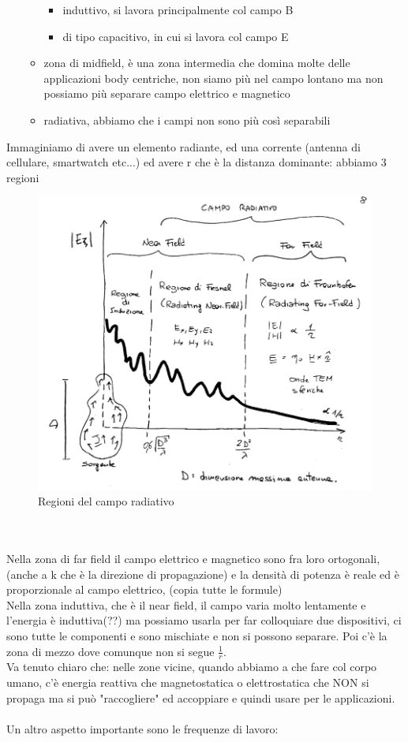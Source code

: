 \documentclass[oneside, 12pt]{extbook}
\begin{document}
\begin{itemize}
\begin{itemize}
		\begin{itemize}
			\item induttivo, si lavora principalmente col campo B
			\item di tipo capacitivo, in cui si lavora col campo E 
		\end{itemize}
		\item zona di midfield, è una zona intermedia che domina molte delle applicazioni body centriche, non siamo più nel campo lontano ma non possiamo più separare campo elettrico e magnetico
		\item radiativa, abbiamo che i campi non sono più così separabili
	\end{itemize}
\end{itemize}
Immaginiamo di avere un elemento radiante, ed una corrente (antenna di cellulare, smartwatch etc...) ed avere r che è la distanza dominante: abbiamo 3 regioni
\begin{figure}[!h]
	\includegraphics[scale=0.5]{immagini/regioni_campo.png}
	\caption{Regioni del campo radiativo}
\end{figure}
\\\\Nella zona di far field il campo elettrico e magnetico sono fra loro ortogonali, (anche a k che è la direzione di propagazione) e la densità di potenza è reale ed è proporzionale al campo elettrico, (copia tutte le formule)\\Nella zona induttiva, che è il near field, il campo varia molto lentamente e l'energia è induttiva(??) ma possiamo usarla per far colloquiare due dispositivi, ci sono tutte le componenti e sono mischiate e non si possono separare. Poi c'è la zona di mezzo dove comunque non si segue $\frac{1}{r}$.\\Va tenuto chiaro che: nelle zone vicine, quando abbiamo a che fare col corpo umano, c'è energia reattiva che  magnetostatica o elettrostatica che NON si propaga ma si può "raccogliere" ed accoppiare e quindi usare per le applicazioni.\\\\Un altro aspetto importante sono le frequenze di lavoro:
\end{document}
